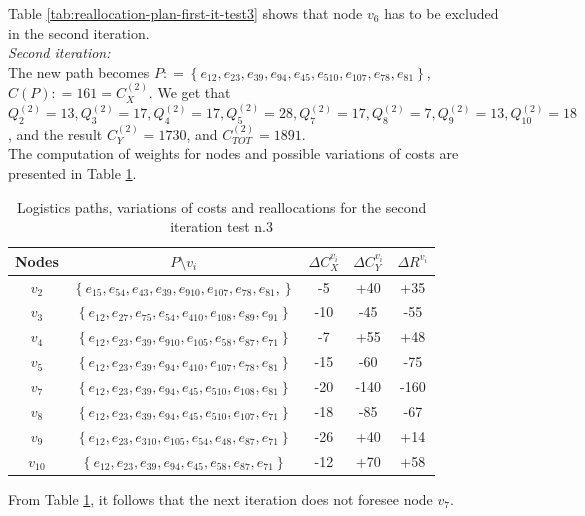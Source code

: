 Table \ref{tab:reallocation-plan-first-it-test3} shows that node $v_6$ has to be excluded in the second iteration.\\
\textit{Second iteration:}\\
The new path becomes $P : = \left\{e_{12},e_{23}, e_{39}, e_{94}, e_{45}, e_{510}, e_{107}, e_{78}, e_{81} \right\}$, $C(P) : = 161 = C_X^{(2)}$. We get that $Q_2^{(2)} = 13, Q_3^{(2)} = 17, Q_4^{(2)} = 17, Q_5^{(2)} = 28,Q_7^{(2)} = 17,Q_8^{(2)} = 7,Q_9^{(2)} = 13,Q_10^{(2)} = 18$, and the result $C_Y^{(2)} = 1730$, and $C_{TOT}^{(2)} = 1891$.\\
The computation of weights for nodes and possible variations of costs are presented in Table \ref{tab:reallocation-plan-second-it-test3}.
\begin{table}[h]
    \centering
    \begin{tabular}{|c|c|c|c|c|}
        \hline
        \textbf{Nodes} & \textbf{$P \setminus v_i$} & \textbf{$\Delta C_X^{v_i}$} & \textbf{$\Delta C_Y^{v_i}$} & \textbf{$\Delta R^{v_i}$} \\
        \hline
        $v_2$ & $\left\{e_{15},  e_{54}, e_{43}, e_{39}, e_{910}, e_{107}, e_{78}, e_{81}, \right\}$ & -5 & +40 & +35 \\
        \hline
        $v_3$ & $\left\{e_{12},  e_{27},  e_{75},  e_{54},  e_{410},  e_{108},  e_{89},  e_{91}  \right\}$ & -10 & -45 & -55 \\
        \hline
        $v_4$ & $\left\{e_{12},  e_{23},  e_{39},  e_{910},  e_{105},  e_{58},  e_{87},  e_{71}  \right\}$ & -7 & +55 & +48 \\
        \hline
        $v_5$ & $\left\{ e_{12},  e_{23},  e_{39},  e_{94},  e_{410},  e_{107},  e_{78},  e_{81}  \right\}$ & -15 & -60 & -75 \\
        \hline
        $v_7$ & $\left\{ e_{12},  e_{23},  e_{39},  e_{94},  e_{45},  e_{510},  e_{108},  e_{81}  \right\}$ & -20 & -140 & -160 \\
        \hline
        $v_8$ & $\left\{e_{12},  e_{23},  e_{39},  e_{94},  e_{45},  e_{510},  e_{107},  e_{71}   \right\}$ & -18 & -85 & -67 \\
        \hline
        $v_9$ & $\left\{e_{12},  e_{23},  e_{310},  e_{105},  e_{54},  e_{48},  e_{87},  e_{71}   \right\}$ & -26 & +40 & +14 \\
        \hline
        $v_10$ & $\left\{ e_{12},  e_{23},  e_{39},  e_{94},  e_{45},  e_{58},  e_{87},  e_{71}  \right\}$ & -12 & +70 & +58 \\
        \hline
    \end{tabular}

    \caption{Logistics paths, variations of costs and reallocations for the second iteration test n.3}
    \label{tab:reallocation-plan-second-it-test3}
\end{table}
From Table \ref{tab:reallocation-plan-second-it-test3}, it follows that the next iteration does not foresee node $v_7$.


